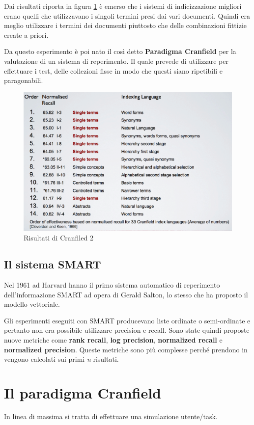 Dai risultati riporta in figura \ref{l13:fig1} è emerso che i sistemi di indicizzazione migliori erano quelli che utilizzavano i singoli termini presi dai vari documenti. Quindi era meglio utilizzare i termini dei documenti piuttosto che delle combinazioni fittizie create a priori.

Da questo esperimento è poi nato il così detto \textbf{Paradigma Cranfield} per la valutazione di un sistema di reperimento. Il quale prevede di utilizzare per effettuare i test, delle collezioni fisse in modo che questi siano ripetibili e paragonabili. 

\begin{figure}
	\centering
	\includegraphics[width=.6\textwidth]{images/l13-fig-1.png}
	\caption{Risultati di Cranfiled 2}\label{l13:fig1}
\end{figure}

\subsection{Il sistema SMART}

Nel 1961 ad Harvard hanno il primo sistema automatico di reperimento dell'informazione SMART ad opera di Gerald Salton, lo stesso che ha proposto il modello vettoriale.

Gli esperimenti eseguiti con SMART producevano liste ordinate o semi-ordinate e pertanto non era possibile utilizzare precision e recall. 
Sono state quindi proposte nuove metriche come \textbf{rank recall}, \textbf{log precision}, \textbf{normalized recall} e \textbf{normalized precision}. Queste metriche sono più complesse perché prendono in vengono calcolati sui primi \textit{n} risultati. 

\section{Il paradigma Cranfield}

In linea di massima si tratta di effettuare una simulazione utente/task.

